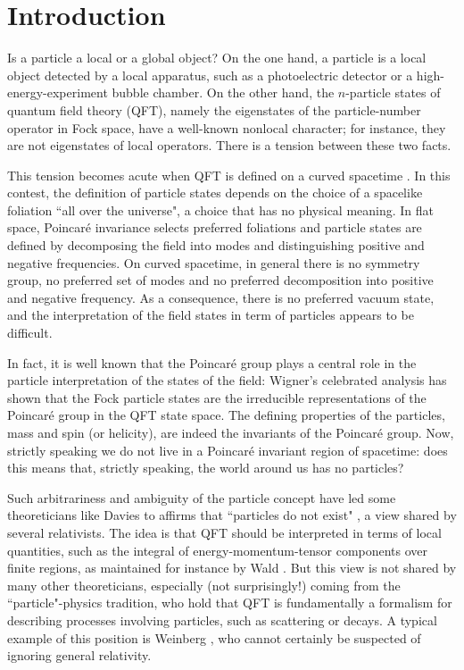 \documentclass[11pt, nofootinbib]{revtex4-2}
\begin{document}
\section{Introduction}


Is a particle a local or a global object?  On the one hand, a particle
is a local object detected by a local apparatus, such as a
photoelectric detector or a high-energy-experiment bubble chamber.  On
the other hand, the $n$-particle states of quantum field theory (QFT),
namely the eigenstates of the particle-number operator in Fock space,
have a well-known nonlocal character; for instance, they are not
eigenstates of local operators.  There is a tension between these two
facts.

This tension becomes acute when QFT is defined on a
curved spacetime \cite{bd,wald}.  In this contest, the definition of
particle states depends on the choice of a spacelike foliation ``all
over the universe", a choice that has no physical meaning.  In flat 
space, Poincar\'e invariance selects 
preferred foliations and particle states are defined by decomposing
the field into modes and distinguishing positive and negative
frequencies.  On curved spacetime, in general there is no 
symmetry group, no preferred set of 
modes and no preferred decomposition into
positive and negative frequency.  As a consequence, there is no
preferred vacuum state, and the interpretation of the field states in
term of particles appears to be difficult.  

In fact, it is well known that the Poincar\'{e} group plays a central
role in the particle interpretation of the states of the field:
Wigner's celebrated analysis \cite{wigner} has shown that the Fock
particle states are the irreducible representations of the Poincar\'{e} group
in the QFT state space.  The defining properties of the particles,
mass and spin (or helicity), are indeed the invariants of the
Poincar\'e group.  Now, strictly speaking we do not live in a
Poincar\'e invariant region of spacetime: does this means that,
strictly speaking, the world around us has no particles?

Such arbitrariness and ambiguity of the particle concept have led some
theoreticians like Davies to affirms that ``particles do not exist"
\cite{Davies}, a view shared by several relativists.  The idea is that
QFT should be interpreted in terms of local quantities, such as the
integral of energy-momentum-tensor components over finite regions, as
maintained for instance by Wald \cite{wald}.  But this view is not
shared by many other theoreticians, especially (not surprisingly!)  coming
from the ``particle"-physics tradition, who hold that QFT is
fundamentally a formalism for describing processes involving
particles, such as scattering or decays.  A typical example of this
position is Weinberg \cite{weinberg}, who cannot certainly be suspected
of ignoring general relativity.
\end{document}
